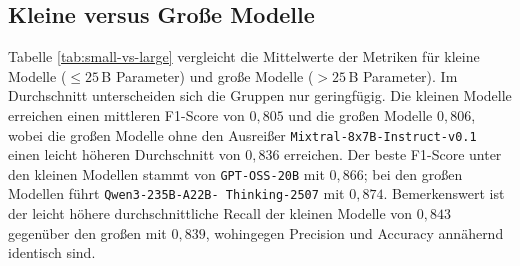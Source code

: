 \subsection*{Kleine versus Große Modelle}

Tabelle \ref{tab:small-vs-large} vergleicht die Mittelwerte der Metriken für kleine Modelle ($\leq 25$\,B Parameter) und große Modelle ($> 25$\,B Parameter). Im Durchschnitt unterscheiden sich die Gruppen nur geringfügig. Die kleinen Modelle erreichen einen mittleren F1-Score von $0{,}805$ und die großen Modelle $0{,}806$, wobei die großen Modelle ohne den Ausreißer \texttt{Mixtral-8x7B-Instruct-v0.1} einen leicht höheren Durchschnitt von $0{,}836$ erreichen. Der beste F1-Score unter den kleinen Modellen stammt von \texttt{GPT-OSS-20B} mit $0{,}866$; bei den großen Modellen führt \texttt{Qwen3-235B-A22B-\linebreak~Thinking-2507} mit $0{,}874$. Bemerkenswert ist der leicht höhere durchschnittliche Recall der kleinen Modelle von $0{,}843$ gegenüber den großen mit $0{,}839$, wohingegen Precision und Accuracy annähernd identisch sind.


